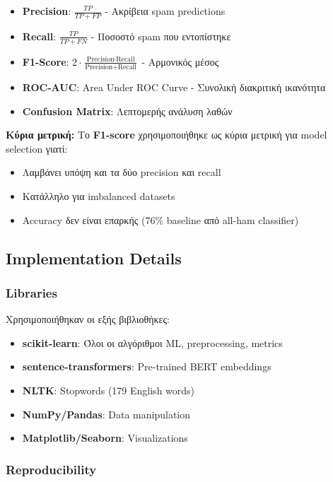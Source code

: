\documentclass[12pt,a4paper,twoside]{book}
\begin{document}
\begin{itemize}
    \item \textbf{Precision}: \(\frac{TP}{TP + FP}\) - Ακρίβεια spam predictions
    \item \textbf{Recall}: \(\frac{TP}{TP + FN}\) - Ποσοστό spam που εντοπίστηκε
    \item \textbf{F1-Score}: \(2 \cdot \frac{\text{Precision} \cdot \text{Recall}}{\text{Precision} + \text{Recall}}\) - Αρμονικός μέσος
    \item \textbf{ROC-AUC}: Area Under ROC Curve - Συνολική διακριτική ικανότητα
    \item \textbf{Confusion Matrix}: Λεπτομερής ανάλυση λαθών
\end{itemize}

\textbf{Κύρια μετρική:} Το \textbf{F1-score} χρησιμοποιήθηκε ως κύρια μετρική για model selection γιατί:
\begin{itemize}
    \item Λαμβάνει υπόψη και τα δύο precision και recall
    \item Κατάλληλο για imbalanced datasets
    \item Accuracy δεν είναι επαρκής (76\% baseline από all-ham classifier)
\end{itemize}

\subsection{Implementation Details}

\subsubsection*{Libraries}

Χρησιμοποιήθηκαν οι εξής βιβλιοθήκες:

\begin{itemize}
    \item \textbf{scikit-learn}: Όλοι οι αλγόριθμοι ML, preprocessing, metrics
    \item \textbf{sentence-transformers}: Pre-trained BERT embeddings
    \item \textbf{NLTK}: Stopwords (179 English words)
    \item \textbf{NumPy/Pandas}: Data manipulation
    \item \textbf{Matplotlib/Seaborn}: Visualizations
\end{itemize}

\subsubsection*{Reproducibility}
\end{document}
